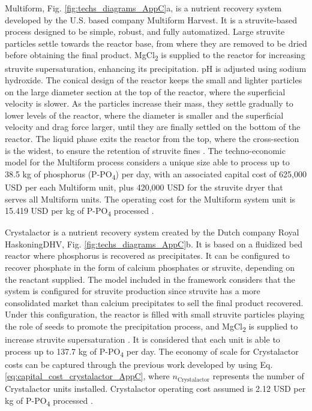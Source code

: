 \begin{refsection}[referencesCh4]
Multiform, Fig. \ref{fig:techs_diagrams_AppC}a, is a nutrient recovery system developed by the U.S. based company Multiform Harvest. It is a struvite-based process designed to be simple, robust, and fully automatized. Large struvite particles settle towards the reactor base, from where they are removed to be dried before obtaining the final product. MgCl\textsubscript{2} is supplied to the reactor for increasing struvite supersaturation, enhancing its precipitation. pH is adjusted using sodium hydroxide. The conical design of the reactor keeps the small and lighter particles on the large diameter section at the top of the reactor, where the superficial velocity is slower. As the particles increase their mass, they settle gradually to lower levels of the reactor, where the diameter is smaller and the superficial velocity and drag force larger, until they are finally settled on the bottom of the reactor. The liquid phase exits the reactor from the top, where the cross-section is the widest, to ensure the retention of struvite fines \citep{Pearl2Kcost2}.
The techno-economic model for the Multiform process considers a unique size able to process up to 38.5 kg of phosphorus (P-PO\textsubscript{4}) per day, with an associated capital cost of 625,000 USD per each Multiform unit, plus 420,000 USD for the struvite dryer that serves all Multiform units. The operating cost for the Multiform system unit is 15.419 USD per kg of P-PO\textsubscript{4} processed \citep{Pearl2Kcost2}.

Crystalactor is a nutrient recovery system created by the Dutch company Royal HaskoningDHV, Fig. \ref{fig:techs_diagrams_AppC}b. It is based on a fluidized bed reactor where phosphorus is recovered as precipitates. It can be configured to recover phosphate in the form of calcium phosphates or struvite, depending on the reactant supplied. The model included in the framework considers that the system is configured for struvite production since struvite has a more consolidated market than calcium precipitates to sell the final product recovered. Under this configuration, the reactor is filled with small struvite particles playing the role of seeds to promote the precipitation process, and MgCl\textsubscript{2} is supplied to increase struvite supersaturation \citep{egle_phosphorus_2016}.
It is considered that each unit is able to process up to 137.7 kg of P-PO\textsubscript{4} per day. The economy of scale for Crystalactor costs can be captured through the previous work developed by \citet{egle_phosphorus_2016} using Eq. \ref{eq:capital_cost_crystalactor_AppC}, where $n_{\text{Crystalactor}}$ represents the number of Crystalactor units installed. Crystalactor operating cost assumed is 2.12 USD per kg of P-PO\textsubscript{4} processed \citep{egle_phosphorus_2016}.


\end{refsection}
